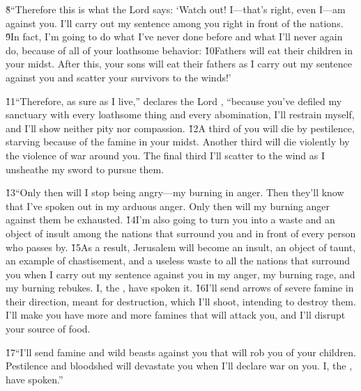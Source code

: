 \v{8}``Therefore this is what the Lord  says: `Watch out! I---that's right, even I---am against you. I'll carry out my sentence among you right in front of the nations. \v{9}In fact, I'm going to do what I've never done before and what I'll never again do, because of all of your loathsome behavior: \v{10}Fathers will eat their children in your midst. After this, your sons will eat their fathers as I carry out my sentence against you and scatter your survivors to the winds!'

\v{11}``Therefore, as sure as I live,'' declares the Lord , ``because you've defiled my sanctuary with every loathsome thing and every abomination, I'll restrain myself, and I'll show neither pity nor compassion. \v{12}A third of you will die by pestilence, starving because of the famine in your midst. Another third will die violently by the violence of war around you. The final third I'll scatter to the wind as I unsheathe my sword to pursue them.

\v{13}``Only then will I stop being angry---my burning in anger. Then they'll know that I've spoken out in my arduous anger. Only then will my burning anger against them be exhausted. \v{14}I'm also going to turn you into a waste and an object of insult among the nations that surround you and in front of every person who passes by. \v{15}As a result, Jerusalem will become an insult, an object of taunt, an example of chastisement, and a useless waste to all the nations that surround you when I carry out my sentence against you in my anger, my burning rage, and my burning rebukes. I, the , have spoken it. \v{16}I'll send arrows of severe famine in their direction, meant for destruction, which I'll shoot, intending to destroy them. I'll make you have more and more famines that will attack you, and I'll disrupt your source of food.

\v{17}``I'll send famine and wild beasts against you that will rob you of your children. Pestilence and bloodshed will devastate you when I'll declare war on you. I, the , have spoken.''

